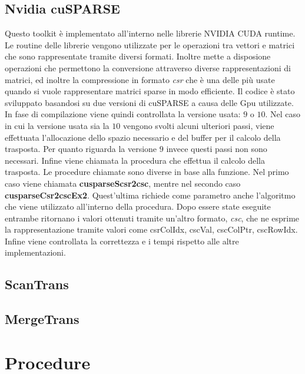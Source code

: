 \documentclass[]{IEEEtran}
\begin{document}
	\subsection{Nvidia cuSPARSE}
	Questo toolkit è implementato all'interno nelle librerie NVIDIA CUDA runtime. Le routine delle librerie vengono utilizzate per le operazioni tra vettori e matrici che sono rappresentate tramite diversi formati. Inoltre mette a disposione operazioni che permettono la conversione attraverso diverse rappresentazioni di matrici, ed inoltre la compressione in formato \textit{csr} che è una delle più usate quando si vuole rappresentare matrici sparse in modo efficiente.\newline	
	Il codice è stato sviluppato basandosi su due versioni di cuSPARSE a causa delle Gpu utilizzate. In fase di compilazione viene quindi controllata la versione usata: $ 9 $ o $ 10 $.\newline
	Nel caso in cui la versione usata sia la $ 10 $ vengono svolti alcuni ulteriori passi, viene effettuata l'allocazione dello spazio necessario e del buffer per il calcolo della trasposta. Per quanto riguarda la versione $ 9 $ invece questi passi non sono necessari.\newline
	Infine viene chiamata la procedura che effettua il calcolo della trasposta. \newline
	Le procedure chiamate sono diverse in base alla funzione. Nel primo caso viene chiamata \textbf{cusparseScsr2csc}, mentre nel secondo caso \textbf{cusparseCsr2cscEx2}. Quest'ultima richiede come parametro anche l'algoritmo che viene utilizzato all'interno della procedura.\newline
	Dopo essere state eseguite entrambe ritornano i valori ottenuti tramite un'altro formato, \textit{csc}, che ne esprime la rappresentazione tramite valori come csrColIdx, cscVal, cscColPtr, cscRowIdx. Infine viene controllata la correttezza e i tempi rispetto alle altre implementazioni.

	\subsection{ScanTrans}
	
	
	\subsection{MergeTrans}
	

\section{Procedure}
\label{procedure}
\end{document}
